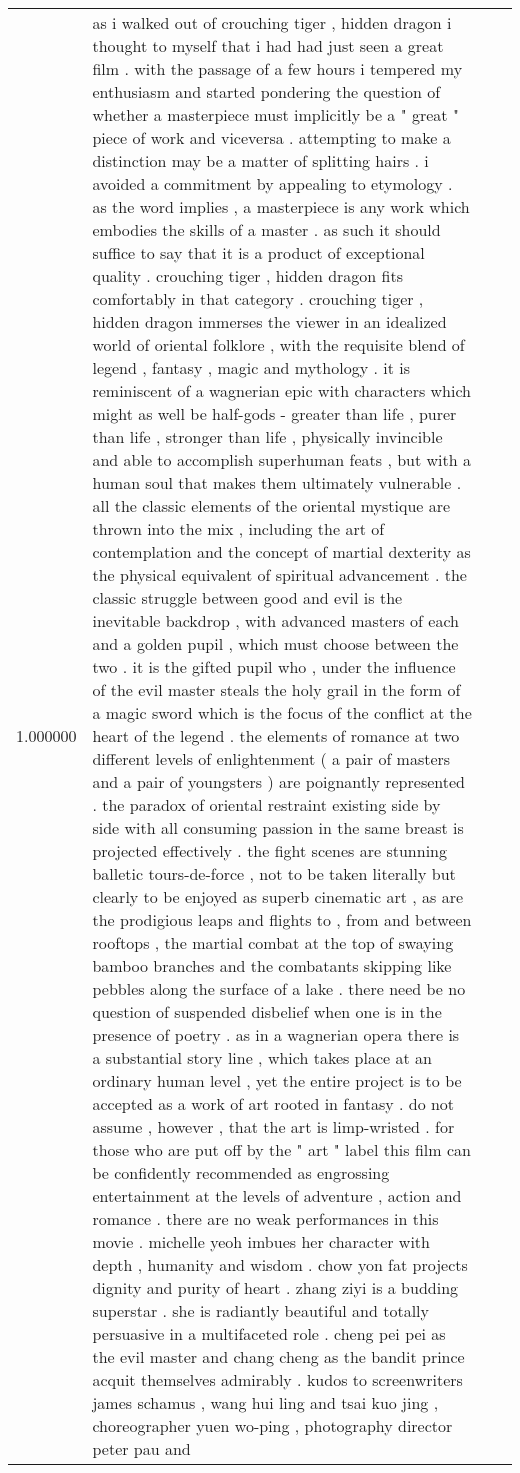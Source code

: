 \begin{tabular}{r{1cm} p{0.4in} r{1cm} p{0.4in}}
1.000000 & as i walked out of crouching tiger , hidden dragon i thought to myself that i had had just seen a great film .  with the passage of a few hours i tempered my enthusiasm and started pondering the question of whether a masterpiece must implicitly be a " great " piece of work and viceversa .  attempting to make a distinction may be a matter of splitting hairs .  i avoided a commitment by appealing to etymology .  as the word implies , a masterpiece is any work which embodies the skills of a master .  as such it should suffice to say that it is a product of exceptional quality .  crouching tiger , hidden dragon fits comfortably in that category .  crouching tiger , hidden dragon immerses the viewer in an idealized world of oriental folklore , with the requisite blend of legend , fantasy , magic and mythology .  it is reminiscent of a wagnerian epic with characters which might as well be half-gods - greater than life , purer than life , stronger than life , physically invincible and able to accomplish superhuman feats , but with a human soul that makes them ultimately vulnerable .  all the classic elements of the oriental mystique are thrown into the mix , including the art of contemplation and the concept of martial dexterity as the physical equivalent of spiritual advancement .  the classic struggle between good and evil is the inevitable backdrop , with advanced masters of each and a golden pupil , which must choose between the two .  it is the gifted pupil who , under the influence of the evil master steals the holy grail in the form of a magic sword which is the focus of the conflict at the heart of the legend .  the elements of romance at two different levels of enlightenment ( a pair of masters and a pair of youngsters ) are poignantly represented .  the paradox of oriental restraint existing side by side with all consuming passion in the same breast is projected effectively .  the fight scenes are stunning balletic tours-de-force , not to be taken literally but clearly to be enjoyed as superb cinematic art , as are the prodigious leaps and flights to , from and between rooftops , the martial combat at the top of swaying bamboo branches and the combatants skipping like pebbles along the surface of a lake .  there need be no question of suspended disbelief when one is in the presence of poetry .  as in a wagnerian opera there is a substantial story line , which takes place at an ordinary human level , yet the entire project is to be accepted as a work of art rooted in fantasy .  do not assume , however , that the art is limp-wristed .  for those who are put off by the " art " label this film can be confidently recommended as engrossing entertainment at the levels of adventure , action and romance .  there are no weak performances in this movie .  michelle yeoh imbues her character with depth , humanity and wisdom .  chow yon fat projects dignity and purity of heart .  zhang ziyi is a budding superstar .  she is radiantly beautiful and totally persuasive in a multifaceted role .  cheng pei pei as the evil master and chang cheng as the bandit prince acquit themselves admirably .  kudos to screenwriters james schamus , wang hui ling and tsai kuo jing , choreographer yuen wo-ping , photography director peter pau and 
\end{tabular}
